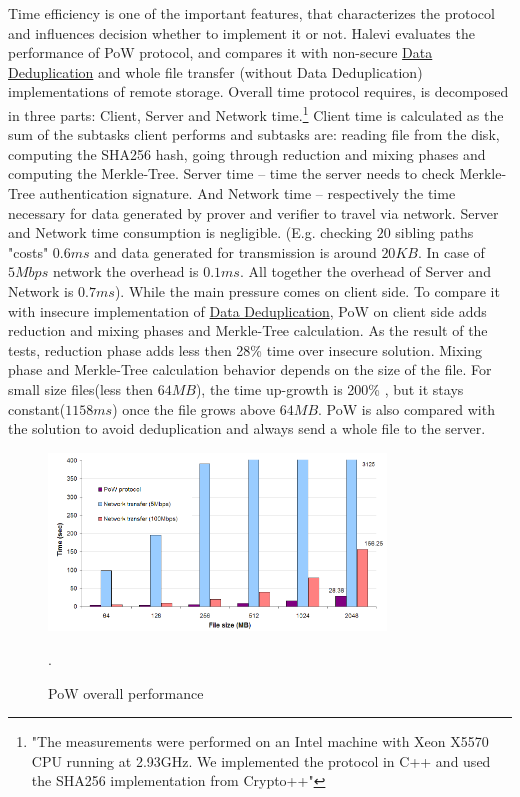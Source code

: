 \documentclass[12pt]{article}
\begin{document}
Time efficiency is one of the important features, that characterizes the protocol and influences decision whether to implement it or not. Halevi evaluates the performance of PoW protocol, and  compares it with non-secure  \hyperref [sub:Deduplication]{Data Deduplication} and whole file transfer (without Data Deduplication) implementations of remote storage. Overall time protocol requires, is decomposed in three parts: Client, Server and Network time.\footnote{"The measurements were performed on an Intel machine with Xeon X5570 CPU running at 2.93GHz. We implemented the protocol in C++ and used the SHA256 implementation from Crypto++"} Client time is calculated as the sum of the subtasks client performs and subtasks are: reading file from the disk, computing the SHA256 hash, going through reduction and mixing phases and  computing the Merkle-Tree. Server time --  time the server needs to check Merkle-Tree authentication signature. And Network time -- respectively the time necessary for data generated by prover and verifier to travel via network. Server and Network time consumption is negligible. (E.g. checking $20$ sibling paths "costs" $0.6ms$ and data generated for transmission  is around $20KB$. In case of $5Mbps$ network the overhead is $0.1 ms$. All together the overhead of Server and Network is $0.7 ms$). While the main pressure comes on client side. To  compare it with insecure implementation of \hyperref [sub:Deduplication]{Data Deduplication}, PoW on client side adds reduction and mixing phases and Merkle-Tree calculation. As the result of the tests, reduction phase adds less then 28\% time over insecure solution. Mixing phase and Merkle-Tree calculation behavior depends on the size of the file. For small size files(less then $64MB$), the time up-growth is 200\% , but it stays  constant($1158ms$) once the file grows above $64MB$. PoW is also compared with the solution to avoid deduplication and always send a whole file to the server.


\begin{figure}[ht] 
\begin{center}
\includegraphics[width=0.8\textwidth]{PoWgraph}
\caption{PoW overall performance\cite{PoW}}
\label{fig:PoWgraph} .
\end{center}
\end{figure}
\end{document}
